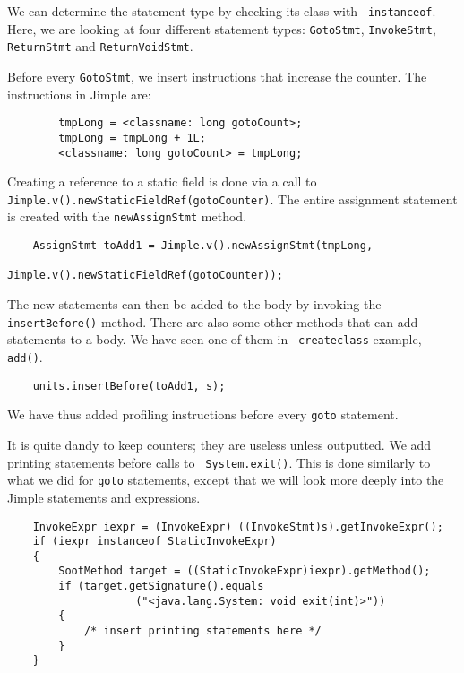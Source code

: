 \documentclass{article}
\begin{document}
We can determine the statement type by checking its class with {\tt
instanceof}.  Here, we are looking at four different statement types:
{\tt GotoStmt}, {\tt InvokeStmt}, {\tt ReturnStmt} and {\tt ReturnVoidStmt}.

Before every {\tt GotoStmt}, we insert instructions that increase the
counter. The instructions in Jimple are:

\begin{verbatim}
        tmpLong = <classname: long gotoCount>;
        tmpLong = tmpLong + 1L;
        <classname: long gotoCount> = tmpLong;
\end{verbatim}

Creating a reference to a static field is done via a call to
{\tt Jimple.v().newStaticFieldRef(gotoCounter)}. The entire
assignment statement is created with the {\tt newAssignStmt} method.

\begin{verbatim}
    AssignStmt toAdd1 = Jimple.v().newAssignStmt(tmpLong,
                                Jimple.v().newStaticFieldRef(gotoCounter));
\end{verbatim}

The new statements can then be added to the body by invoking the {\tt
insertBefore()} method.  There are also some other methods that can
add statements to a body.  We have seen one of them in {\tt
createclass} example, {\tt add()}.

\begin{verbatim}
    units.insertBefore(toAdd1, s);
\end{verbatim}

We have thus added profiling instructions before every {\tt goto} statement. 

It is quite dandy to keep counters; they are useless unless
outputted. We add printing statements before calls to {\tt
System.exit()}.  This is done similarly to what we did for {\tt goto}
statements, except that we will look more deeply into the Jimple
statements and expressions.

\begin{verbatim}
    InvokeExpr iexpr = (InvokeExpr) ((InvokeStmt)s).getInvokeExpr();
    if (iexpr instanceof StaticInvokeExpr)
    {
        SootMethod target = ((StaticInvokeExpr)iexpr).getMethod();
        if (target.getSignature().equals
                    ("<java.lang.System: void exit(int)>"))
        {
            /* insert printing statements here */
        }
    }
\end{verbatim}
\end{document}
